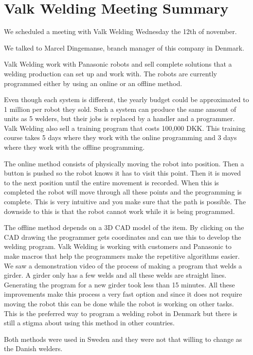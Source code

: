 \section{Valk Welding Meeting Summary}\label{Valk_meeting_resume}
We scheduled a meeting with Valk Welding Wednesday the 12th of november.

We talked to Marcel Dingemanse, branch manager of this company in Denmark.

Valk Welding work with Panasonic robots and sell complete solutions that a welding production can set up and work with. 
The robots are currently programmed either by using an online or an offline method. 
 
Even though each system is different, the yearly budget could be approximated to 1 million per robot they sold.
Such a system can produce the same amount of units as 5 welders, but their jobs is replaced by a handler and a programmer. 
Valk Welding also sell a training program that costs 100,000 DKK.
This training course takes 5 days where they work with the online programming and 3 days where they work with the offline programming.

The online method consists of physically moving the robot into position. Then a button is pushed so the robot knows it has to visit this point.
Then it is moved to the next position until the entire movement is recorded.
When this is completed the robot will move through all these points and the programming is complete.
This is very intuitive and you make sure that the path is possible.
The downside to this is that the robot cannot work while it is being programmed.

The offline method depends on a 3D CAD model of the item. 
By clicking on the CAD drawing the programmer gets coordinates and can use this to develop the welding program.
Valk Welding is working with customers and Panasonic to make macros that help the programmers make the repetitive algorithms easier.
We saw a demonstration video of the process of making a program that welds a girder. 
A girder only has a few welds and all these welds are straight lines. 
Generating the program for a new girder took less than 15 minutes. 
All these improvements make this process a very fast option and since it does not require moving the robot this can be done while the robot is working on other tasks.
This is the preferred way to program a welding robot in Denmark but there is still a stigma about using this method in other countries.

Both methods were used in Sweden and they were not that willing to change as the Danish welders.

